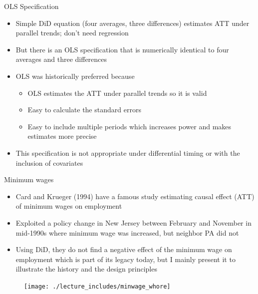 \documentclass{beamer}
\begin{document}
\begin{frame}{OLS Specification}
	
	\begin{itemize}
	\item Simple DiD equation (four averages, three differences) estimates ATT under parallel trends; don't need regression
	\item But there is an OLS specification that is numerically identical to four averages and three differences
	\item OLS was historically preferred because
		\begin{itemize}
		\item OLS estimates the ATT under parallel trends so it is valid
		\item Easy to calculate the standard errors
		\item Easy to include multiple periods which increases power and makes estimates more precise
		\end{itemize}
	\item This specification is not appropriate under differential timing or with the inclusion of covariates
	\end{itemize}
\end{frame}

\begin{frame}{Minimum wages}

\begin{itemize}
\item Card and Krueger (1994) have a famous study estimating causal effect (ATT) of minimum wages on employment
\item Exploited a policy change in New Jersey between February and November in mid-1990s where minimum wage was increased, but neighbor PA did not
\item Using DiD, they do not find a negative effect of the minimum wage on employment which is part of its legacy today, but I mainly present it to illustrate the history and the design principles
\end{itemize}

\end{frame}

\begin{frame}
	\begin{figure}
	\texttt{[image: ./lecture\_includes/minwage\_whore]}
	\end{figure}
\end{frame}
\end{document}
